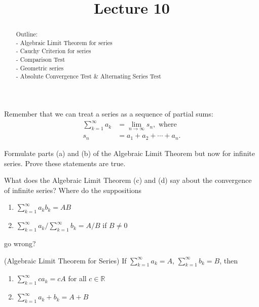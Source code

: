 \documentclass{ximera}
\begin{document}
    \title{Lecture 10}
    
    \begin{abstract}  
    Outline: \\
    - Algebraic Limit Theorem for series\\
    - Cauchy Criterion for series\\
    - Comparison Test \\
    - Geometric series \\
    - Absolute Convergence Test \& Alternating Series Test
\end{abstract}

\maketitle


Remember that we can treat a series as a sequence of partial sums:
\begin{align*}
    \sum\limits_{k=1}^\infty a_k &= \lim\limits_{n\to\infty} s_n, \text{ where}
    \\
    s_n &= a_1 + a_2 + \cdots + a_n.
\end{align*}

\begin{exercise}
    Formulate parts (a) and (b) of the Algebraic Limit Theorem but now for infinite series.  Prove these statements are true.
\end{exercise}

\begin{exercise}
    What does the Algebraic Limit Theorem (c) and (d) say about the convergence of infinite series?  Where do the suppositions
    \begin{enumerate}
        \item $\sum\limits_{k=1}^\infty a_kb_k= AB$
        \item $\sum\limits_{k=1}^\infty a_k/\sum\limits_{k=1}^\infty b_k = A/B$ if $B\neq 0$
    \end{enumerate}
    go wrong?
\end{exercise}

\begin{theorem}{(Algebraic Limit Theorem for Series)}
    If $\sum\limits_{k=1}^\infty a_k = A$, $\sum\limits_{k=1}^\infty b_k =B$, then 
    \begin{enumerate}
        \item $\sum\limits_{k=1}^\infty ca_k = cA$ for all $c\in\mathbb{R}$
        \item $\sum\limits_{k=1}^\infty a_k +b_k = A+B$
    \end{enumerate}
\end{theorem}
\end{document}
